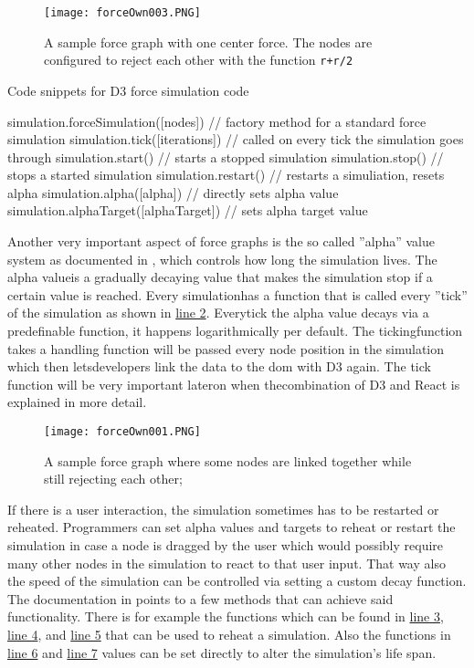 \begin{figure}
  \centering
  \texttt{[image: forceOwn003.PNG]}
  \caption{A sample force graph with one center force. The nodes are configured to reject each other with the function \texttt{r+r/2}}
  \label{fig:force004}
\end{figure}

\begin{program}
\caption{Code snippets for D3 force simulation code}
\label{prog:simulation}
\begin{JsCode}
simulation.forceSimulation([nodes]) // factory method for a standard force simulation
simulation.tick([iterations]) // called on every tick the simulation goes through
simulation.start() // starts a stopped simulation
simulation.stop() // stops a started simulation
simulation.restart() // restarts a simuliation, resets alpha
simulation.alpha([alpha]) // directly sets alpha value
simulation.alphaTarget([alphaTarget]) // sets alpha target value
\end{JsCode}
\end{program}

Another very important aspect of force graphs is the so called ''alpha'' value system as documented in \cite[/d3-force/blob/master/README.md]{D3Github}, which controls how long the simulation lives. The alpha valueis a gradually decaying value that makes the simulation stop if a certain value is reached. Every simulationhas a function that is called every ''tick'' of the simulation as shown in \hyperref[prog:simulation]{line 2}. Everytick the alpha value decays via a predefinable function, it happens logarithmically per default. The tickingfunction takes a handling function will be passed every node position in the simulation which then letsdevelopers link the data to the dom with D3 again. The tick function will be very important lateron when thecombination of D3 and React is explained in more detail.

\begin{figure}
    \centering
    \texttt{[image: forceOwn001.PNG]}
    \caption{A sample force graph where some nodes are linked together while still rejecting each other;}
    \label{fig:force005}
  \end{figure}

If there is a user interaction, the simulation sometimes has to be restarted or reheated. Programmers can set alpha values and targets to reheat or restart the simulation in case a node is dragged by the user which would possibly require many other nodes in the simulation to react to that user input. That way also the speed of the simulation can be controlled via setting a custom decay function. The documentation in \cite[/d3-force/blob/master/README.md]{D3Github} points to a few methods that can achieve said functionality. There is for example the functions which can be found in \hyperref[prog:simulation]{line 3}, \hyperref[prog:simulation]{line 4}, and \hyperref[prog:simulation]{line 5} that can be used to reheat a simulation. Also the functions in \hyperref[prog:simulation]{line 6} and \hyperref[prog:simulation]{line 7} values can be set directly to alter the simulation's life span.

